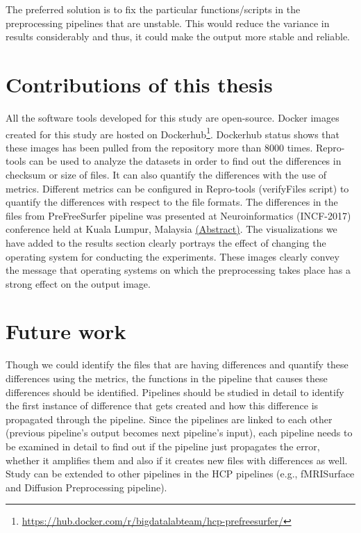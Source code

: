 The preferred solution is to fix the particular functions/scripts in 
the preprocessing pipelines that are unstable. This would reduce the 
variance in results considerably and thus, it could make the output 
more stable and reliable.

\section{Contributions of this thesis}
All the software tools developed for this study are open-source.
 Docker images created for this study are hosted on 
 Dockerhub\footnote{\url{https://hub.docker.com/r/bigdatalabteam/hcp-prefreesurfer/}}. 
 Dockerhub status shows that these images has been pulled from the 
 repository more than 8000 times. Repro-tools can be used to analyze 
 the datasets in order to find out the differences in checksum or size 
 of files. It can also quantify the differences with the use of 
 metrics. Different metrics can be configured in Repro-tools 
 (verifyFiles script) to quantify the differences with respect to the 
 file formats. The differences in the files from PreFreeSurfer pipeline was presented at Neuroinformatics (INCF-2017) conference held at Kuala Lumpur, Malaysia \href{https://abstracts.g-node.org/abstracts/1d0afd7e-0542-4b79-99df-e15c5e0e4487}{(Abstract)}. The visualizations we have added to the results section 
 clearly portrays the effect of changing the operating system for 
 conducting the experiments. These images clearly convey the message 
 that operating systems on which the preprocessing takes place has a 
 strong effect on the output image.

\section{Future work}
Though we could identify the files that are having differences and quantify these differences using the metrics, the functions in the pipeline that causes these differences should be identified.
Pipelines should be studied in detail to identify the first instance of difference that gets created and how this difference is propagated through the pipeline.
Since the pipelines are linked to each other (previous pipeline's output becomes next pipeline's input), each pipeline needs to be examined in detail to find out if the pipeline just propagates the error, whether it amplifies them and also if it creates new files with differences as well. 
Study can be extended to other pipelines in the HCP pipelines (e.g., fMRISurface and Diffusion Preprocessing pipeline).
